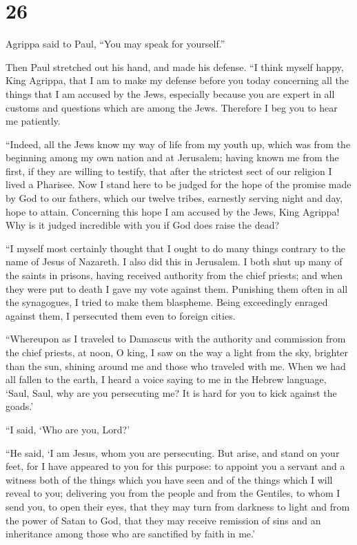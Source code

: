 \hypertarget{section-25}{%
\section{26}\label{section-25}}

 Agrippa said to Paul, ``You may speak for yourself.''

Then Paul stretched out his hand, and made his defense. 
``I think myself happy, King Agrippa, that I am to make my defense
before you today concerning all the things that I am accused by the
Jews,  especially because you are expert in all customs
and questions which are among the Jews. Therefore I beg you to hear me
patiently.

 ``Indeed, all the Jews know my way of life from my youth
up, which was from the beginning among my own nation and at Jerusalem;
 having known me from the first, if they are willing to
testify, that after the strictest sect of our religion I lived a
Pharisee.  Now I stand here to be judged for the hope of
the promise made by God to our fathers,  which our twelve
tribes, earnestly serving night and day, hope to attain. Concerning this
hope I am accused by the Jews, King Agrippa!  Why is it
judged incredible with you if God does raise the dead?

 ``I myself most certainly thought that I ought to do many
things contrary to the name of Jesus of Nazareth.  I also
did this in Jerusalem. I both shut up many of the saints in prisons,
having received authority from the chief priests; and when they were put
to death I gave my vote against them.  Punishing them
often in all the synagogues, I tried to make them blaspheme. Being
exceedingly enraged against them, I persecuted them even to foreign
cities.

 ``Whereupon as I traveled to Damascus with the authority
and commission from the chief priests,  at noon, O king,
I saw on the way a light from the sky, brighter than the sun, shining
around me and those who traveled with me.  When we had
all fallen to the earth, I heard a voice saying to me in the Hebrew
language, `Saul, Saul, why are you persecuting me? It is hard for you to
kick against the goads.'

 ``I said, `Who are you, Lord?'

``He said, `I am Jesus, whom you are persecuting.  But
arise, and stand on your feet, for I have appeared to you for this
purpose: to appoint you a servant and a witness both of the things which
you have seen and of the things which I will reveal to you;
 delivering you from the people and from the Gentiles, to
whom I send you,  to open their eyes, that they may turn
from darkness to light and from the power of Satan to God, that they may
receive remission of sins and an inheritance among those who are
sanctified by faith in me.'

